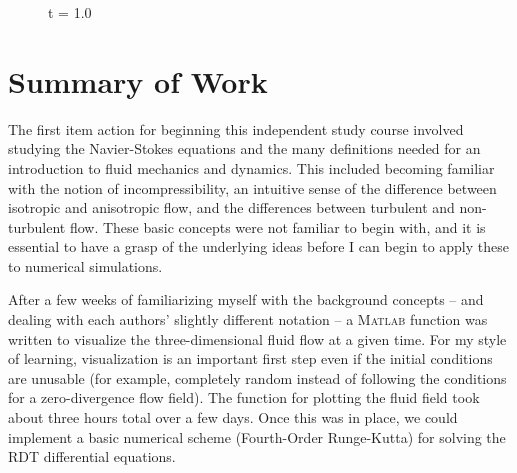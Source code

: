 \documentclass[paper=a4, fontsize=11pt]{scrartcl} %
\numberwithin{equation}{section} %
\numberwithin{figure}{section} %
\numberwithin{table}{section} %
\begin{document}
    \begin{figure}[H]
        \caption{t = 1.0}
        \label{fig:frame3_100}
    \end{figure}




\pagebreak
\section{Summary of Work}

\par
The first item action for beginning this independent study course involved studying the Navier-Stokes equations and the many definitions needed for an introduction to fluid mechanics and dynamics. This included becoming familiar with the notion of incompressibility, an intuitive sense of the difference between isotropic and anisotropic flow, and the differences between turbulent and non-turbulent flow. These basic concepts were not familiar to begin with, and it is essential to have a grasp of the underlying ideas before I can begin to apply these to numerical simulations. 

\par
After a few weeks of familiarizing myself with the background concepts -- and dealing with each authors' slightly different notation -- a \textsc{Matlab} function was written to visualize the three-dimensional fluid flow at a given time. For my style of learning, visualization is an important first step even if the initial conditions are unusable (for example, completely random instead of following the conditions for a zero-divergence flow field). The function for plotting the fluid field took about three hours total over a few days. Once this was in place, we could implement a basic numerical scheme (Fourth-Order Runge-Kutta) for solving the RDT differential equations. 
\end{document}
